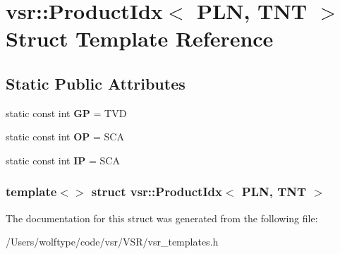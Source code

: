 \hypertarget{structvsr_1_1_product_idx_3_01_p_l_n_00_01_t_n_t_01_4}{\section{vsr\-:\-:Product\-Idx$<$ P\-L\-N, T\-N\-T $>$ Struct Template Reference}
\label{structvsr_1_1_product_idx_3_01_p_l_n_00_01_t_n_t_01_4}
}
\subsection*{Static Public Attributes}
\begin{DoxyCompactItemize}
\item 
\hypertarget{structvsr_1_1_product_idx_3_01_p_l_n_00_01_t_n_t_01_4_a605e2c87b3cecee99f4a13c670569f35}{static const int {\bfseries G\-P} = T\-V\-D}\label{structvsr_1_1_product_idx_3_01_p_l_n_00_01_t_n_t_01_4_a605e2c87b3cecee99f4a13c670569f35}

\item 
\hypertarget{structvsr_1_1_product_idx_3_01_p_l_n_00_01_t_n_t_01_4_a5b5df6299db13aa09cfad5e49f232a31}{static const int {\bfseries O\-P} = S\-C\-A}\label{structvsr_1_1_product_idx_3_01_p_l_n_00_01_t_n_t_01_4_a5b5df6299db13aa09cfad5e49f232a31}

\item 
\hypertarget{structvsr_1_1_product_idx_3_01_p_l_n_00_01_t_n_t_01_4_a5ae0e486cd7516eb71c541acd8fcca47}{static const int {\bfseries I\-P} = S\-C\-A}\label{structvsr_1_1_product_idx_3_01_p_l_n_00_01_t_n_t_01_4_a5ae0e486cd7516eb71c541acd8fcca47}

\end{DoxyCompactItemize}
\subsubsection*{template$<$$>$ struct vsr\-::\-Product\-Idx$<$ P\-L\-N, T\-N\-T $>$}



The documentation for this struct was generated from the following file\-:\begin{DoxyCompactItemize}
\item 
/\-Users/wolftype/code/vsr/\-V\-S\-R/vsr\-\_\-templates.\-h\end{DoxyCompactItemize}
